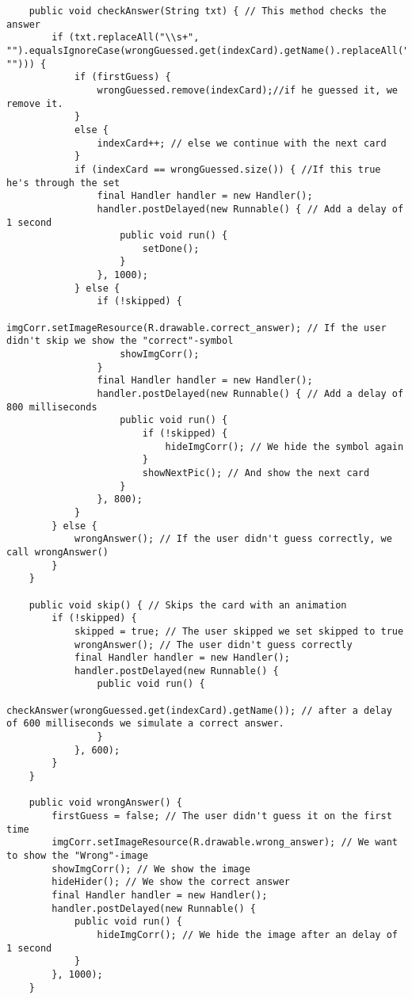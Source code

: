 \begin{lstlisting}
    public void checkAnswer(String txt) { // This method checks the answer
        if (txt.replaceAll("\\s+", "").equalsIgnoreCase(wrongGuessed.get(indexCard).getName().replaceAll("\\s+", ""))) {
            if (firstGuess) {
                wrongGuessed.remove(indexCard);//if he guessed it, we remove it.
            }
            else {
                indexCard++; // else we continue with the next card
            }
            if (indexCard == wrongGuessed.size()) { //If this true he's through the set
                final Handler handler = new Handler();
                handler.postDelayed(new Runnable() { // Add a delay of 1 second
                    public void run() {
                        setDone();
                    }
                }, 1000);
            } else {
                if (!skipped) {
                    imgCorr.setImageResource(R.drawable.correct_answer); // If the user didn't skip we show the "correct"-symbol
                    showImgCorr();
                }
                final Handler handler = new Handler();
                handler.postDelayed(new Runnable() { // Add a delay of 800 milliseconds
                    public void run() {
                        if (!skipped) {
                            hideImgCorr(); // We hide the symbol again
                        }
                        showNextPic(); // And show the next card
                    }
                }, 800);
            }
        } else {
            wrongAnswer(); // If the user didn't guess correctly, we call wrongAnswer()
        }
    }

    public void skip() { // Skips the card with an animation
        if (!skipped) {
            skipped = true; // The user skipped we set skipped to true
            wrongAnswer(); // The user didn't guess correctly
            final Handler handler = new Handler();
            handler.postDelayed(new Runnable() {
                public void run() {
                    checkAnswer(wrongGuessed.get(indexCard).getName()); // after a delay of 600 milliseconds we simulate a correct answer.
                }
            }, 600);
        }
    }

    public void wrongAnswer() {
        firstGuess = false; // The user didn't guess it on the first time
        imgCorr.setImageResource(R.drawable.wrong_answer); // We want to show the "Wrong"-image
        showImgCorr(); // We show the image
        hideHider(); // We show the correct answer
        final Handler handler = new Handler();
        handler.postDelayed(new Runnable() {
            public void run() {
                hideImgCorr(); // We hide the image after an delay of 1 second
            }
        }, 1000);
    }


\end{lstlisting}
